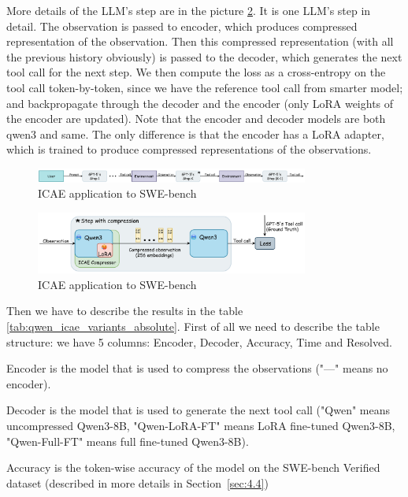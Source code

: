 More details of the LLM's step are in the picture \ref{fig:mega2}. It is one LLM's step in detail.
The observation is passed to encoder, which produces compressed representation of the observation.
Then this compressed representation (with all the previous history obviously) is passed to the decoder, which generates the next tool call for the next step.
We then compute the loss as a cross-entropy on the tool call token-by-token, since we have the reference tool call from smarter model; and backpropagate through the decoder and the encoder (only LoRA weights of the encoder are updated).
Note that the encoder and decoder models are both qwen3 and same. 
The only difference is that the encoder has a LoRA adapter, which is trained to produce compressed representations of the observations.

\begin{figure}[hbt]
  \centering
  \includegraphics[width=0.8\textwidth]{graphs/mega-1.jpeg}
  \caption{ICAE application to SWE-bench}
  \label{fig:mega1}
\end{figure}

\begin{figure}[hbt]
  \centering
  \includegraphics[width=0.8\textwidth]{graphs/mega-2.jpeg}
  \caption{ICAE application to SWE-bench}
  \label{fig:mega2}
\end{figure}

Then we have to describe the results in the table \ref{tab:qwen_icae_variants_absolute}.
First of all we need to describe the table structure: we have 5 columns: Encoder, Decoder, Accuracy, Time and Resolved.

Encoder is the model that is used to compress the observations ("---" means no encoder).

Decoder is the model that is used to generate the next tool call ("Qwen" means uncompressed Qwen3-8B, "Qwen-LoRA-FT" means LoRA fine-tuned Qwen3-8B, "Qwen-Full-FT" means full fine-tuned Qwen3-8B).

Accuracy is the token-wise accuracy of the model on the SWE-bench Verified dataset (described in more details in Section~\ref{sec:4.4})

